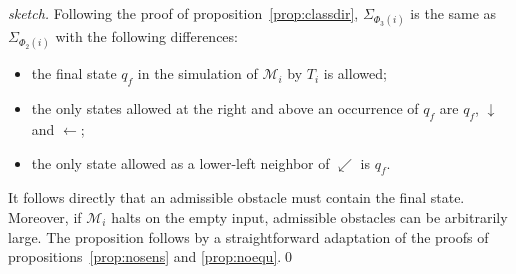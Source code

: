 \documentclass{llncs}
\newcommand{\oT}{\downarrow}
\newcommand{\oR}{\leftarrow}
\newcommand{\oTR}{\swarrow}
\newcommand{\phiclassdir}{\Phi_2}
\newcommand{\phiclassinv}{\Phi_3}
\newcommand{\machine}[1]{\mathcal{M}_{#1}}
\newcommand{\obstacl}[1]{\Sigma_{#1}}
\newcommand{\tileset}[1]{T_{#1}}
\begin{document}
\begin{proof}[sketch]
  Following the proof of proposition~\ref{prop:classdir},
  $\obstacl{\phiclassinv(i)}$ is the same as
  $\obstacl{\phiclassdir(i)}$ with the following differences:
  \begin{itemize}
  \item the final state $q_f$ in the simulation of $\machine{i}$ by
    $\tileset{i}$ is allowed;
  \item the only states allowed at the right and above an occurrence of
    $q_f$ are $q_f$, $\oT$ and $\oR$;
  \item the only state allowed as a lower-left neighbor of $\oTR$ is $q_f$.
  \end{itemize}
  It follows directly that an admissible obstacle must contain the
  final state. Moreover, if $\machine{i}$ halts on the empty input,
  admissible obstacles can be arbitrarily large. The proposition
  follows by a straightforward adaptation of the proofs of
  propositions~\ref{prop:nosens} and \ref{prop:noequ}.\qed
\end{proof}
\end{document}
